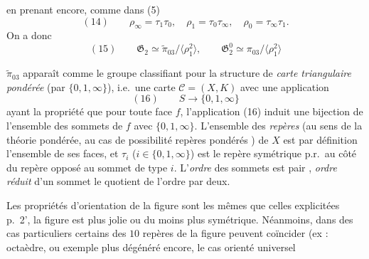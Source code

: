 \documentclass[11pt,a4paper]{article}
\begin{document}

en prenant encore, comme dans (5)
\[
  (14)\qquad \rho_{\infty} = \tau_{1}\tau_{0}, \quad \rho_{1} = \tau_{0}\tau_{\infty}, \quad \rho_{0} = \tau_{\infty}\tau_{1} .
\]
On a donc
\[
  (15)\qquad \mathfrak{G}_{2} \simeq \tilde\pi_{03}/\langle\rho_{1}^{2}\rangle, \qquad \mathfrak{G}_{2}^{0} \simeq \pi_{03}/\langle\rho_{1}^{2}\rangle
\]

  \struck{\ill{}} $\tilde\pi_{03}$ apparaît comme le groupe \og classifiant \fg{} pour la structure de \og \emph{carte triangulaire} \emph{pondérée} \fg{} (par $\{0, 1, \infty\}$), i.e.\ une carte $\mathcal{C} = (X, K)$  avec une application
\[
  (16)\qquad S \longrightarrow \{0, 1, \infty\}
\]
ayant la propriété que pour toute face $f$, l'application (16) induit une bijection de l'ensemble des sommets de $f$ avec $\{0, 1, \infty\}$. L'ensemble des \emph{repères} (au sens de la théorie  pondérée, au cas de possibilité \ill{} \ill{} \ill{} \og repères pondérés \fg) de $X$ est par définition l'ensemble de ses faces, et $\tau_{i}$ ($i \in \{0, 1, \infty\}$) est le \struck{\ill{}} repère symétrique p.r.\ au \struck{\ill{}} côté du repère opposé au sommet de type $i$. L'\emph{ordre} des sommets est pair \ill{}, \ill{} \emph{ordre réduit} d'un sommet le quotient de l'ordre par deux.


Les propriétés d'orientation de la figure sont les mêmes que celles explicitées p.~2', la figure est plus jolie ou du moins plus symétrique. Néanmoins, dans des cas particuliers certains des $10$ \struck{\ill{}} repères de la figure peuvent coïncider (ex : octaèdre, ou exemple plus dégénéré encore, le cas \og orienté universel \fg
\end{document}
